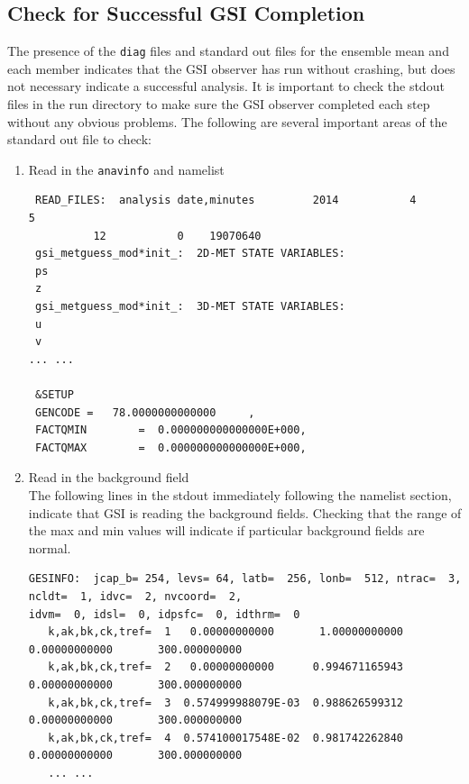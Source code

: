\subsection{Check for Successful GSI Completion}

The presence of the \verb|diag| files and standard out files for the ensemble mean and each member indicates that the GSI observer has run without crashing, but does not necessary indicate a successful analysis. It is important to check the stdout files in the run directory to make sure the GSI observer completed each step without any obvious problems. The following are several important areas of the standard out file to check:
\begin{enumerate}
\item Read in the \verb|anavinfo| and namelist 

\begin{footnotesize}
\begin{verbatim}
 READ_FILES:  analysis date,minutes         2014           4           5
          12           0    19070640
 gsi_metguess_mod*init_:  2D-MET STATE VARIABLES:
 ps
 z
 gsi_metguess_mod*init_:  3D-MET STATE VARIABLES:
 u
 v
... ...

 &SETUP
 GENCODE =   78.0000000000000     ,
 FACTQMIN        =  0.000000000000000E+000,
 FACTQMAX        =  0.000000000000000E+000,
\end{verbatim}
\end{footnotesize}

\item Read in the background field  \\
The following lines in the stdout immediately following the namelist section, indicate that GSI is reading the background fields. Checking that the range of the max and min values will indicate if particular background fields are normal.

\begin{scriptsize}
\begin{verbatim}
GESINFO:  jcap_b= 254, levs= 64, latb=  256, lonb=  512, ntrac=  3, ncldt=  1, idvc=  2, nvcoord=  2, 
idvm=  0, idsl=  0, idpsfc=  0, idthrm=  0
   k,ak,bk,ck,tref=  1   0.00000000000       1.00000000000       0.00000000000       300.000000000 
   k,ak,bk,ck,tref=  2   0.00000000000      0.994671165943       0.00000000000       300.000000000 
   k,ak,bk,ck,tref=  3  0.574999988079E-03  0.988626599312       0.00000000000       300.000000000 
   k,ak,bk,ck,tref=  4  0.574100017548E-02  0.981742262840       0.00000000000       300.000000000 
   ... ...
\end{verbatim}
\end{scriptsize}


\end{enumerate}

